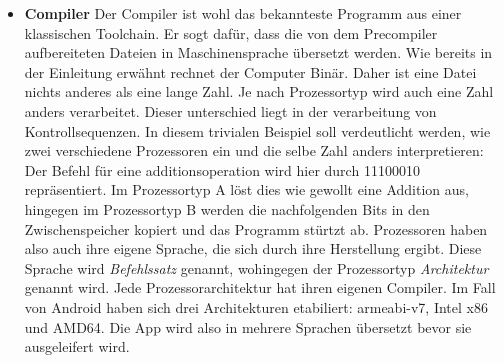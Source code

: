 \begin{itemize}
\item \textbf{Compiler} Der Compiler ist wohl das bekannteste Programm aus einer klassischen Toolchain. Er sogt dafür, dass die von dem Precompiler aufbereiteten Dateien in Maschinensprache übersetzt werden.
Wie bereits in der Einleitung erwähnt rechnet der Computer Binär. Daher ist eine Datei nichts anderes als eine lange Zahl. Je nach Prozessortyp wird auch eine Zahl anders verarbeitet. Dieser unterschied liegt in der verarbeitung von Kontrollsequenzen. In diesem trivialen Beispiel soll verdeutlicht werden, wie zwei verschiedene Prozessoren ein und die selbe Zahl anders interpretieren: Der Befehl für eine additionsoperation wird hier durch 11100010 repräsentiert. Im Prozessortyp A löst dies wie gewollt eine Addition aus, hingegen im Prozessortyp B werden die nachfolgenden Bits in den Zwischenspeicher kopiert und das Programm stürtzt ab. Prozessoren haben also auch ihre eigene Sprache, die sich durch ihre Herstellung ergibt. Diese Sprache wird \textit{Befehlssatz} genannt, wohingegen der Prozessortyp \textit{Architektur} genannt wird. Jede Prozessorarchitektur hat ihren eigenen Compiler.
Im Fall von Android haben sich drei Architekturen etabiliert: armeabi-v7, Intel x86 und AMD64. Die App wird also in mehrere Sprachen übersetzt bevor sie ausgeleifert wird.
\end{itemize}

\newpage

